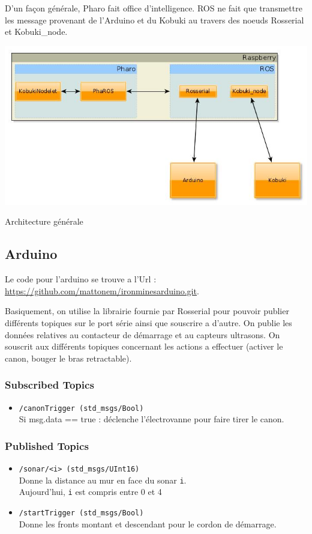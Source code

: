 \documentclass[a4paper, 11pt]{article}
\begin{document}
D'un façon générale, Pharo fait office d'intelligence. ROS ne fait que
transmettre les message provenant de l'Arduino et du Kobuki au travers
des noeuds Rosserial et Kobuki\_node.
\begin{center}
  \includegraphics[width=\linewidth]{./architecture.jpg}
  \caption{Architecture générale}
  \label{archi_generale}
\end{center}
\subsection{Arduino}
Le code pour l'arduino se trouve a l'Url
:\\ \url{https://github.com/mattonem/ironminesarduino.git}.

Basiquement, on utilise la librairie fournie par Rosserial pour
pouvoir publier différents topiques sur le port série ainsi que souscrire
a d'autre. On publie les données relatives au contacteur de démarrage
et au capteurs ultrasons. On souscrit aux différents topiques concernant
les actions a effectuer (activer le canon, bouger le bras
retractable).

\subsubsection{Subscribed Topics}

\begin{itemize}
\item \texttt{/canonTrigger (std\_msgs/Bool)}\\ 
  Si msg.data == true :
  déclenche l'électrovanne pour faire tirer le canon.
\end{itemize}

\subsubsection{Published Topics}

\begin{itemize}
\item \texttt{/sonar/<i> (std\_msgs/UInt16)}\\
  Donne la distance au mur en face du sonar \texttt{i}.\\
  Aujourd'hui, \texttt{i} est compris entre 0 et 4
\item \texttt{/startTrigger (std\_msgs/Bool)}\\ 
  Donne les fronts montant et descendant pour le cordon de démarrage.
\end{itemize}
\end{document}
